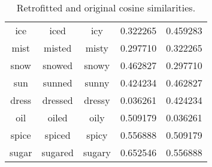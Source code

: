 \documentclass[12pt]{article}
\begin{document}
\begin{table}[p]
\begin{center}
\begin{tabular}{||c c c c c||}
            ice & iced & icy & 0.322265 & 0.459283 \\
            mist & misted & misty & 0.297710 & 0.322265 \\
            snow & snowed & snowy & 0.462827 & 0.297710 \\
            sun & sunned & sunny & 0.424234 & 0.462827 \\
            dress & dressed & dressy & 0.036261 & 0.424234 \\
            oil & oiled & oily & 0.509179 & 0.036261 \\
            spice & spiced & spicy & 0.556888 & 0.509179 \\
            sugar & sugared & sugary & 0.652546 & 0.556888 \\
            \hline    
                
            \end{tabular}
        \end{center}
        \caption{Retrofitted and original cosine similarities.}
        \end{table}
\end{document}
